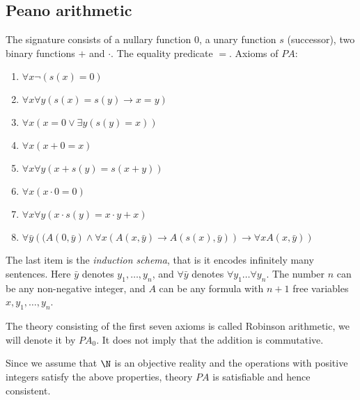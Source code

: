 

\setcounter{section}{3}
\setcounter{subsection}{4}
\setcounter{dfn}{24}

\subsection{Peano arithmetic}
The signature consists of a nullary function $0$, a unary function $s$ (successor), two binary functions $+$ and $\cdot$.
The equality predicate $=$.
Axioms of $PA$:
\begin{enumerate}
\item
$\forall x \neg(s(x) = 0)$
\item
$\forall x \forall y (s(x)=s(y) \to x=y)$
\item
$\forall x (x = 0 \vee \exists y (s(y)=x))$
\item
$\forall x (x+0=x)$
\item
$\forall x \forall y (x+s(y) = s(x+y))$
\item
$\forall x (x \cdot 0 = 0)$
\item
$\forall x \forall y (x \cdot s(y) = x \cdot y + x)$
\item
$\forall \bar y \left((A(0, \bar y) \wedge \forall x (A(x, \bar y) \to A(s(x), \bar y)) \to \forall x A(x, \bar y)\right)$
\end{enumerate}
The last item is the \emph{induction schema}, that is it encodes infinitely many sentences.
Here $\bar y$ denotes $y_1, \ldots, y_n$, and $\forall \bar y$ denotes $\forall y_1 \ldots \forall y_n$.
The number $n$ can be any non-negative integer, and $A$ can be any formula with $n+1$ free variables $x, y_1, \ldots, y_n$.


The theory consisting of the first seven axioms is called Robinson arithmetic, we will denote it by $PA_0$.
It does not imply that the addition is commutative.

Since we assume that $\N$ is an objective reality and the operations with positive integers satisfy the above properties,
theory $PA$ is satisfiable and hence consistent.






